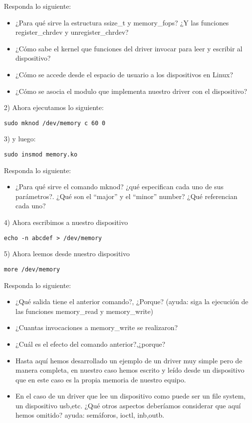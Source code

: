 Responda lo siguiente:
\begin{itemize}  
\item ¿Para qué sirve la estructura ssize\_t y memory\_fops? ¿Y las funciones register\_chrdev y unregister\_chrdev?
\item ¿Cómo sabe el kernel que funciones del driver invocar para leer y escribir al dispositivo?
\item ¿Cómo se accede desde el espacio de usuario a los dispositivos en Linux?
\item ¿Cómo se asocia el modulo que implementa nuestro driver con el dispositivo?
\end{itemize}  


2) Ahora ejecutamos lo siguiente:
\begin{verbatim}
sudo mknod /dev/memory c 60 0
\end{verbatim}

3) y luego:
\begin{verbatim}
sudo insmod memory.ko
\end{verbatim}

Responda lo siguiente:
\begin{itemize}  
\item ¿Para qué sirve el comando mknod? ¿qué especifican cada uno de sus parámetros?. ¿Qué son el “major” y el “minor” number? ¿Qué referencian cada uno?
\end{itemize}  

4) Ahora escribimos a nuestro dispositivo
\begin{verbatim}
echo -n abcdef > /dev/memory
\end{verbatim}

5) Ahora leemos desde nuestro dispositivo
\begin{verbatim}
more /dev/memory
\end{verbatim}


Responda lo siguiente:
\begin{itemize}  
\item ¿Qué salida tiene el anterior comando?, ¿Porque? (ayuda: siga la ejecución de las funciones memory\_read y memory\_write) 
\item ¿Cuantas invocaciones a memory\_write se realizaron?
\item ¿Cuál es el efecto del comando anterior?,¿porque?
\item Hasta aquí hemos desarrollado un ejemplo de un driver muy simple pero de manera completa, en nuestro caso hemos escrito y leído desde un dispositivo que en este caso es la propia memoria de nuestro equipo.
\item En el caso de un driver que lee un dispositivo como puede ser un file system, un dispositivo usb,etc. ¿Qué otros aspectos deberíamos considerar que aquí hemos omitido? ayuda: semáforos, ioctl, inb,outb.
\end{itemize}  

